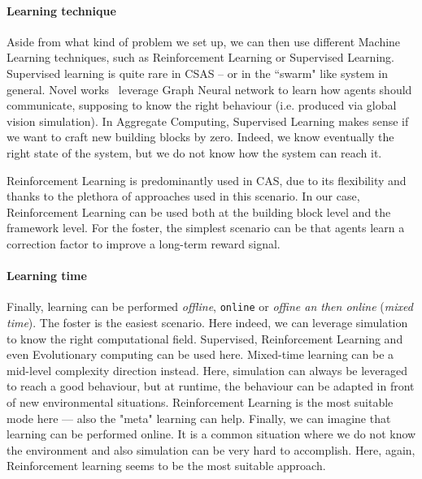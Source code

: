 \documentclass[conference]{IEEEtran}
\begin{document}
\paragraph{Learning technique}
Aside from what kind of problem we set up, we can then use different Machine Learning techniques,
 such as Reinforcement Learning or Supervised Learning.
%
Supervised learning is quite rare in CSAS -- or in the ``swarm" like system in general.
%
Novel works~\cite{DBLP:conf/corl/TolstayaGPP0R19} leverage Graph Neural network to learn how agents should communicate, supposing to know the right behaviour (i.e. produced via global vision simulation).
%
In Aggregate Computing, Supervised Learning makes sense if we want to craft new building blocks by zero. 
% 
Indeed, we know eventually the right state of the system, but we do not know how the system can reach it.

Reinforcement Learning is predominantly used in CAS, 
 due to its flexibility and thanks to the plethora of approaches used in this scenario.
% 
In our case, Reinforcement Learning can be used both at the building block level and the framework level.
%
For the foster, the simplest scenario can be that agents learn a correction factor to improve a long-term reward signal.
 
\paragraph{Learning time}
Finally, learning can be performed \textit{offline}, \texttt{online} or \textit{offine an then online} (\textit{mixed time}).
% 
The foster is the easiest scenario.
 Here indeed, we can leverage simulation to know the right computational field.
% 
Supervised, Reinforcement Learning and even Evolutionary computing can be used here.
%
Mixed-time learning can be a mid-level complexity direction instead.
 Here, simulation can always be leveraged to reach a good behaviour, but at runtime, the behaviour can be adapted in front of new environmental situations. 
%
Reinforcement Learning is the most suitable mode here --- also the "meta" learning can help.
%
Finally, we can imagine that learning can be performed online. 
 It is a common situation where we do not know the environment and also simulation can be very hard to accomplish. 
 Here, again, Reinforcement learning seems to be the most suitable approach.
 
\end{document}
